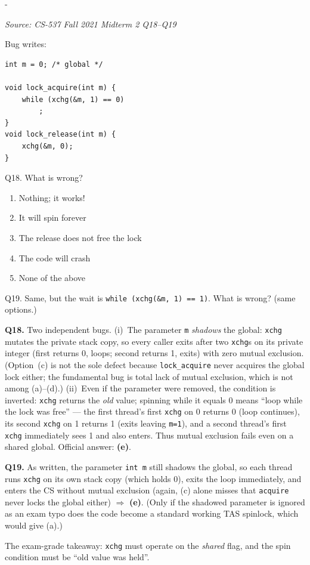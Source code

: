 \documentclass[11pt,a4paper]{article}
\makeatletter
\newcommand{\keepspace}[1]{\par\penalty-100\begingroup
  \setlength{\dimen@}{#1}\dimen@ii\pagegoal\advance\dimen@ii-\pagetotal
  \ifdim\dimen@>\dimen@ii\ifdim\dimen@ii>\z@\vfil\fi\break\fi\endgroup}
\newcounter{qn}[section]
\newenvironment{Qn}[4]{%
  \refstepcounter{qn}\keepspace{7\baselineskip}%
  \begin{tcolorbox}[qboxstyle, title={Q\thesection.\theqn\ \ [#1 \textbar\ #2]\ \ #4}]%
  {\footnotesize\color{g3}\textit{Source: #3}}\par\smallskip%
}{%
  \end{tcolorbox}%
}
\newenvironment{Sol}{%
  \begin{tcolorbox}[sboxstyle, title={Solution}]%
}{%
  \end{tcolorbox}\vspace{0.35em}%
}
\makeatother
\begin{document}
\begin{Qn}{Hard}{Lect 17}{CS-537 Fall 2021 Midterm 2 Q18--Q19}{A TAS spinlock that takes the flag by value}
Bug writes:

\begin{lstlisting}[numbers=none]
int m = 0; /* global */

void lock_acquire(int m) {
    while (xchg(&m, 1) == 0)
        ;
}
void lock_release(int m) {
    xchg(&m, 0);
}
\end{lstlisting}

Q18. What is wrong?
\begin{enumerate}
\item[(a)] Nothing; it works!
\item[(b)] It will spin forever
\item[(c)] The release does not free the lock
\item[(d)] The code will crash
\item[(e)] None of the above
\end{enumerate}

Q19. Same, but the wait is \texttt{while (xchg(\&m, 1) == 1)}. What is wrong? (same options.)
\end{Qn}
\begin{Sol}
\textbf{Q18.} Two independent bugs. (i)~The parameter \texttt{m} \emph{shadows} the global: \texttt{xchg} mutates the private stack copy, so every caller exits after two \texttt{xchg}s on its private integer (first returns 0, loops; second returns 1, exits) with zero mutual exclusion. (Option~(c) is not the sole defect because \texttt{lock\_acquire} never acquires the global lock either; the fundamental bug is total lack of mutual exclusion, which is not among (a)--(d).) (ii)~Even if the parameter were removed, the condition is inverted: \texttt{xchg} returns the \emph{old} value; spinning while it equals 0 means ``loop while the lock was free'' --- the first thread's first \texttt{xchg} on 0 returns 0 (loop continues), its second \texttt{xchg} on 1 returns 1 (exits leaving \texttt{m=1}), and a second thread's first \texttt{xchg} immediately sees 1 and also enters. Thus mutual exclusion fails even on a shared global. Official answer: \textbf{(e)}.

\textbf{Q19.} As written, the parameter \texttt{int m} still shadows the global, so each thread runs \texttt{xchg} on its own stack copy (which holds 0), exits the loop immediately, and enters the CS without mutual exclusion (again, (c) alone misses that \texttt{acquire} never locks the global either) $\Rightarrow$ \textbf{(e)}. (Only if the shadowed parameter is ignored as an exam typo does the code become a standard working TAS spinlock, which would give (a).)

The exam-grade takeaway: \texttt{xchg} must operate on the \emph{shared} flag, and the spin condition must be ``old value was held''.
\end{Sol}
\end{document}
